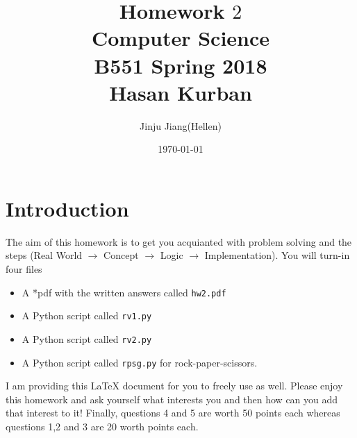 \documentclass{article}
\begin{document}
\title{Homework $2$\\ Computer Science \\ B551 Spring 2018\\ Hasan Kurban}         %
\author{Jinju Jiang(Hellen)}        %
\date{\today}          %
\maketitle


\makeatother     %




\pagestyle{plain}
\section*{Introduction}
The aim of this homework is to get you acquianted with problem solving and the steps  (Real World $\rightarrow$ Concept $\rightarrow$ Logic  $\rightarrow$ Implementation).  You will turn-in four files\begin{itemize} \item A *pdf with the written answers called \texttt{hw2.pdf} \item A Python script called \texttt{rv1.py} \item  A Python script called  \texttt{rv2.py} \item A Python script called \texttt{rpsg.py}  for rock-paper-scissors.\end{itemize}  I am providing this \LaTeX{} document for you to freely use as well. Please enjoy this homework and ask yourself what interests you and then how can you add that interest to it!  Finally, questions 4 and 5 are
worth 50 points each whereas questions 1,2 and 3 are 20 worth points each.

\newpage
\end{document}
